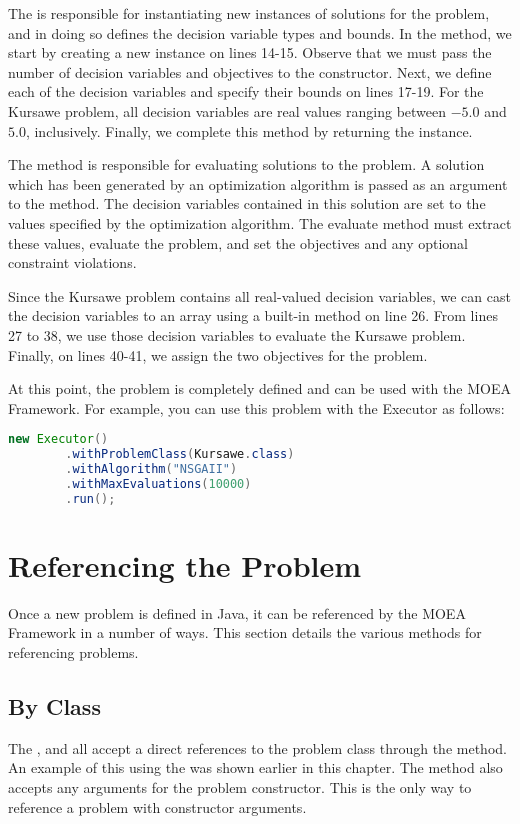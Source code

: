 The  is responsible for instantiating new instances of solutions for the problem, and in doing so defines the decision variable types and bounds.  In the  method, we start by creating a new  instance on lines 14-15.  Observe that we must pass the number of decision variables and objectives to the  constructor.  Next, we define each of the decision variables and specify their bounds on lines 17-19.  For the Kursawe problem, all decision variables are real values ranging between $-5.0$ and $5.0$, inclusively.  Finally, we complete this method by returning the  instance.

The  method is responsible for evaluating solutions to the problem.  A solution which has been generated by an optimization algorithm is passed as an argument to the  method.  The decision variables contained in this solution are set to the values specified by the optimization algorithm.  The evaluate method must extract these values, evaluate the problem, and set the objectives and any optional constraint violations.

Since the Kursawe problem contains all real-valued decision variables, we can cast the decision variables to an array using a built-in method on line 26.  From lines 27 to 38, we use those decision variables to evaluate the Kursawe problem.  Finally, on lines 40-41, we assign the two objectives for the problem.

At this point, the problem is completely defined and can be used with the MOEA Framework.  For example, you can use this problem with the Executor as follows:

\begin{lstlisting}[language=Java]
new Executor()
		.withProblemClass(Kursawe.class)
		.withAlgorithm("NSGAII")
		.withMaxEvaluations(10000)
		.run();
\end{lstlisting}

\section{Referencing the Problem}
Once a new problem is defined in Java, it can be referenced by the MOEA Framework in a number of ways.  This section details the various methods for referencing problems.

\subsection{By Class}
The ,  and  all accept a direct references to the problem class through the  method.  An example of this using the  was shown earlier in this chapter.  The  method also accepts any arguments for the problem constructor.  This is the only way to reference a problem with constructor arguments.

